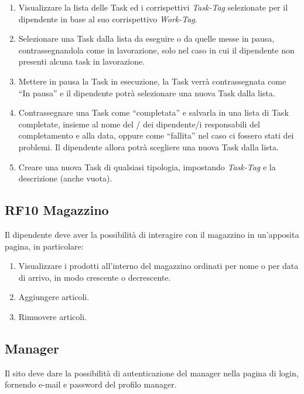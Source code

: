 \documentclass{report}
\begin{document}
\begin{enumerate}
	\item Visualizzare la lista delle Task ed i corrispettivi \textit{Task-Tag} selezionate per il dipendente in base al suo corrispettivo \textit{Work-Tag}.
	
	\item Selezionare una Task dalla lista da eseguire o da quelle messe in pausa, contrassegnandola come in lavorazione, solo nel caso in cui il dipendente non presenti alcuna task in lavorazione.
	
	\item Mettere in pausa la Task in esecuzione, la Task verrà contrassegnata come “In pausa” e il dipendente potrà selezionare una nuova Task dalla lista.
	
	\item Contrassegnare una Task come “completata” e salvarla in una lista di Task completate, insieme al nome del / dei dipendente/i responsabili del completamento e alla data, oppure come “fallita” nel caso ci fossero stati dei problemi. Il dipendente allora potrà scegliere una nuova Task dalla lista.
	
	\item Creare una nuova Task di qualsiasi tipologia, impostando \textit{Task-Tag} e la descrizione (anche vuota).
	
\end{enumerate}

\subsection*{RF10 Magazzino}
Il dipendente deve aver la possibilità di interagire con il magazzino in un'apposita pagina, in particolare:
\begin{enumerate}
	\item Visualizzare i prodotti all'interno del magazzino ordinati per nome o per data di arrivo, in modo crescente o decrescente.
	\item Aggiungere articoli.
	\item Rimuovere articoli.
\end{enumerate}

\subsection{Manager}
Il sito deve dare la possibilità di autenticazione del manager nella pagina di login, fornendo e-mail e password del profilo manager.
\end{document}
